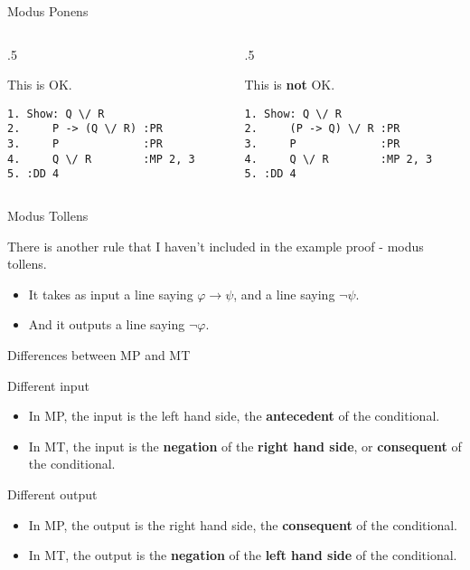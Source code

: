 \documentclass[
  ignorenonframetext,
]{beamer}
\providecommand{\tightlist}{%
  \setlength{\itemsep}{0pt}\setlength{\parskip}{0pt}}
\renewcommand{\,}{\text{, }}
\def\begincols{\begin{columns}}
\def\begincol{\begin{column}}
\def\endcol{\end{column}}
\def\endcols{\end{columns}}
\begin{document}
\begin{frame}[fragile]{Modus Ponens}
\protect\hypertarget{modus-ponens-3}{}

\begincols
\begincol{.5\textwidth}

This is OK.

\begin{verbatim}
1. Show: Q \/ R
2.     P -> (Q \/ R) :PR
3.     P             :PR
4.     Q \/ R        :MP 2, 3
5. :DD 4
\end{verbatim}

\endcol
\begincol{.5\textwidth}

This is \textbf{not} OK.

\begin{verbatim}
1. Show: Q \/ R
2.     (P -> Q) \/ R :PR
3.     P             :PR
4.     Q \/ R        :MP 2, 3
5. :DD 4
\end{verbatim}

\endcol
\endcols

\end{frame}

\begin{frame}{Modus Tollens}
\protect\hypertarget{modus-tollens}{}

There is another rule that I haven't included in the example proof -
modus tollens.

\begin{itemize}
\tightlist
\item
  It takes as input a line saying \(\varphi \rightarrow \psi\), and a
  line saying \(\neg \psi\).
\item
  And it outputs a line saying \(\neg \varphi\).
\end{itemize}

\end{frame}

\begin{frame}{Differences between MP and MT}
\protect\hypertarget{differences-between-mp-and-mt}{}

Different input

\begin{itemize}
\tightlist
\item
  In MP, the input is the left hand side, the \textbf{antecedent} of the
  conditional.
\item
  In MT, the input is the \textbf{negation} of the \textbf{right hand
  side}, or \textbf{consequent} of the conditional.
\end{itemize}

Different output

\begin{itemize}
\tightlist
\item
  In MP, the output is the right hand side, the \textbf{consequent} of
  the conditional.
\item
  In MT, the output is the \textbf{negation} of the \textbf{left hand
  side} of the conditional.
\end{itemize}

\end{frame}
\end{document}

